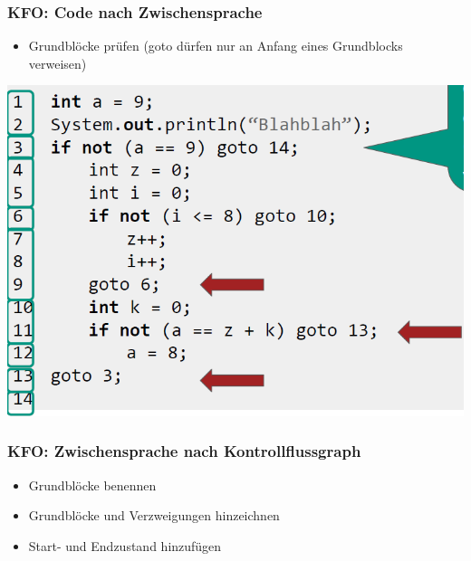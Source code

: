 \documentclass[18pt]{beamer}
\begin{document}
	\begin{frame}
		\frametitle{KFO: Code nach Zwischensprache}
		\begin{itemize}
			\item 	Grundblöcke prüfen (goto dürfen nur an Anfang eines Grundblocks verweisen)
		\end{itemize}
			\centering \includegraphics[scale=0.34]{./pics/tut5/second-blocks.png}
	\end{frame}

	\begin{frame}
		\frametitle{KFO: Zwischensprache nach Kontrollflussgraph}
		\begin{itemize}
			\item Grundblöcke benennen
			\item Grundblöcke und Verzweigungen hinzeichnen
			\item Start- und Endzustand hinzufügen
		\end{itemize}
	\end{frame}
\end{document}

